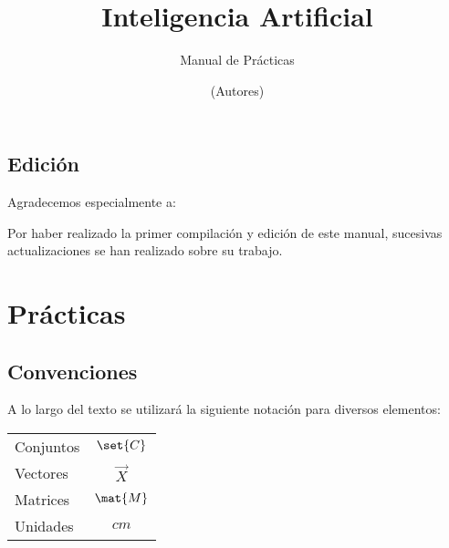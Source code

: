 \documentclass[12pt,openany]{book}
\title{Inteligencia Artificial}
\subtitle{Manual de Prácticas}
\author{
  (Autores)
}
\begin{document}
\maketitle

\chapter*{Edición}


Agradecemos especialmente a:

 
Por haber realizado la primer compilación y edición de este manual, sucesivas actualizaciones se han realizado sobre su trabajo.



\frontmatter %
\tableofcontents
\clearemptydoublepage %

\listofauxcodes


\mainmatter  %



\part{Prácticas}


\chapter*{Convenciones}

A lo largo del texto se utilizará la siguiente notación para diversos elementos:
\begin{longtable}{lc}
 Conjuntos   &   $\set{C}$ \\
 Vectores    &   $\vec{X}$ \\
 Matrices    &   $\mat{M}$ \\
 Unidades    &   $\unit{cm}$
\end{longtable}
\end{document}

